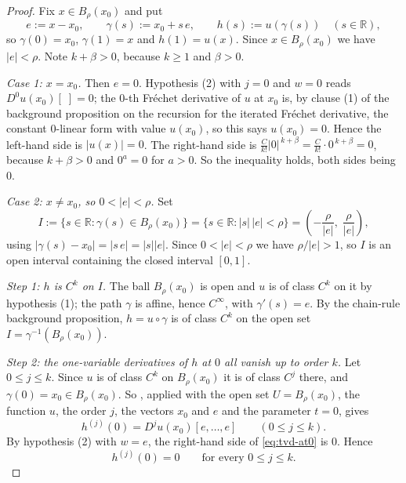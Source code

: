\begin{proof}
Fix $x\in B_\rho(x_0)$ and put
\[
  e:=x-x_0,\qquad \gamma(s):=x_0+s\,e,\qquad h(s):=u(\gamma(s))\quad(s\in\mathbb{R}),
\]
so $\gamma(0)=x_0$, $\gamma(1)=x$ and $h(1)=u(x)$.  Since $x\in B_\rho(x_0)$ we have
$\lvert e\rvert<\rho$.  Note $k+\beta>0$, because $k\ge1$ and $\beta>0$.

\medskip\noindent\emph{Case 1: $x=x_0$.}
Then $e=0$.  Hypothesis (2) with $j=0$ and $w=0$ reads $D^{0}u(x_0)[\;]=0$; the $0$-th
Fr\'echet derivative of $u$ at $x_0$ is, by clause (1) of the background proposition on the
recursion for the iterated Fr\'echet derivative, the constant $0$-linear form with value
$u(x_0)$, so this says $u(x_0)=0$.  Hence the left-hand side is $\lvert u(x)\rvert=0$.  The right-hand side
is $\tfrac{C}{k!}\lvert 0\rvert^{\,k+\beta}=\tfrac{C}{k!}\cdot0^{\,k+\beta}=0$, because
$k+\beta>0$ and $0^{a}=0$ for $a>0$.  So the inequality holds, both sides being $0$.

\medskip\noindent\emph{Case 2: $x\neq x_0$, so $0<\lvert e\rvert<\rho$.}
Set
\[
  I:=\{s\in\mathbb{R}:\gamma(s)\in B_\rho(x_0)\}
   =\{s\in\mathbb{R}:\lvert s\rvert\,\lvert e\rvert<\rho\}
   =\left(-\frac{\rho}{\lvert e\rvert},\;\frac{\rho}{\lvert e\rvert}\right),
\]
using $\lvert\gamma(s)-x_0\rvert=\lvert s\,e\rvert=\lvert s\rvert\lvert e\rvert$.  Since
$0<\lvert e\rvert<\rho$ we have $\rho/\lvert e\rvert>1$, so $I$ is an open interval containing
the closed interval $[0,1]$.

\emph{Step 1: $h$ is $C^{k}$ on $I$.}  The ball $B_\rho(x_0)$ is open and $u$ is of class
$C^{k}$ on it by hypothesis (1); the path $\gamma$ is affine, hence $C^\infty$, with
$\gamma'(s)=e$.  By the chain-rule background proposition, $h=u\circ\gamma$ is of class $C^{k}$
on the open set $I=\gamma^{-1}(B_\rho(x_0))$.

\emph{Step 2: the one-variable derivatives of $h$ at $0$ all vanish up to order $k$.}
Let $0\le j\le k$.  Since $u$ is of class $C^{k}$ on $B_\rho(x_0)$ it is of class $C^{j}$
there, and $\gamma(0)=x_0\in B_\rho(x_0)$.  So , applied with
the open set $U=B_\rho(x_0)$, the function $u$, the order $j$, the vectors $x_0$ and $e$ and
the parameter $t=0$, gives
\begin{equation}\label{eq:tvd-at0}
  h^{(j)}(0)=D^{j}u(x_0)[e,\ldots,e]\qquad(0\le j\le k).
\end{equation}
By hypothesis (2) with $w=e$, the right-hand side of \eqref{eq:tvd-at0} is $0$.  Hence
\begin{equation}\label{eq:tvd-vanish}
  h^{(j)}(0)=0\qquad\text{for every }0\le j\le k .
\end{equation}


\end{proof}
